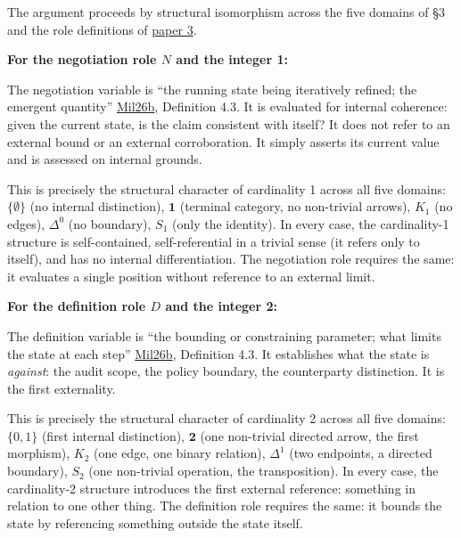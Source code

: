 \documentclass[12pt]{article}
\begin{document}
The argument proceeds by structural isomorphism across the five domains
of §3 and the role definitions of
\href{https://github.com/baardev/truevalue/blob/main/docnav/Research/papers/3_minimal-recursive-triadic-framework/3_minimal-recursive-triadic-framework.pdf}{paper
3}.

\textbf{For the negotiation role \(N\) and the integer 1:}

The negotiation variable is ``the running state being iteratively
refined; the emergent quantity''
\href{https://github.com/baardev/truevalue/blob/main/docnav/Research/papers/3_minimal-recursive-triadic-framework/3_minimal-recursive-triadic-framework.pdf}{Mil26b},
Definition 4.3. It is evaluated for internal coherence: given the
current state, is the claim consistent with itself? It does not refer to
an external bound or an external corroboration. It simply asserts its
current value and is assessed on internal grounds.

This is precisely the structural character of cardinality 1 across all
five domains: \(\{\emptyset\}\) (no internal distinction),
\(\mathbf{1}\) (terminal category, no non-trivial arrows), \(K_1\) (no
edges), \(\Delta^0\) (no boundary), \(S_1\) (only the identity). In
every case, the cardinality-1 structure is self-contained,
self-referential in a trivial sense (it refers only to itself), and has
no internal differentiation. The negotiation role requires the same: it
evaluates a single position without reference to an external limit.

\textbf{For the definition role \(D\) and the integer 2:}

The definition variable is ``the bounding or constraining parameter;
what limits the state at each step''
\href{https://github.com/baardev/truevalue/blob/main/docnav/Research/papers/3_minimal-recursive-triadic-framework/3_minimal-recursive-triadic-framework.pdf}{Mil26b},
Definition 4.3. It establishes what the state is \emph{against}: the
audit scope, the policy boundary, the counterparty distinction. It is
the first externality.

This is precisely the structural character of cardinality 2 across all
five domains: \(\{0,1\}\) (first internal distinction), \(\mathbf{2}\)
(one non-trivial directed arrow, the first morphism), \(K_2\) (one edge,
one binary relation), \(\Delta^1\) (two endpoints, a directed boundary),
\(S_2\) (one non-trivial operation, the transposition). In every case,
the cardinality-2 structure introduces the first external reference:
something in relation to one other thing. The definition role requires
the same: it bounds the state by referencing something outside the state
itself.
\end{document}
